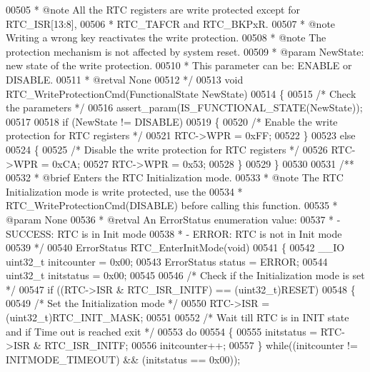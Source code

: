 \begin{DoxyCode}
00505 \textcolor{comment}{  * @note   All the RTC registers are write protected except for RTC\_ISR[13:8], }
00506 \textcolor{comment}{  *         RTC\_TAFCR and RTC\_BKPxR.}
00507 \textcolor{comment}{  * @note   Writing a wrong key reactivates the write protection.}
00508 \textcolor{comment}{  * @note   The protection mechanism is not affected by system reset.  }
00509 \textcolor{comment}{  * @param  NewState: new state of the write protection.}
00510 \textcolor{comment}{  *          This parameter can be: ENABLE or DISABLE.}
00511 \textcolor{comment}{  * @retval None}
00512 \textcolor{comment}{  */}
00513 \textcolor{keywordtype}{void} RTC_WriteProtectionCmd(FunctionalState NewState)
00514 \{
00515   \textcolor{comment}{/* Check the parameters */}
00516   assert_param(IS\_FUNCTIONAL\_STATE(NewState));
00517 
00518   \textcolor{keywordflow}{if} (NewState != DISABLE)
00519   \{
00520     \textcolor{comment}{/* Enable the write protection for RTC registers */}
00521     RTC->WPR = 0xFF;
00522   \}
00523   \textcolor{keywordflow}{else}
00524   \{
00525     \textcolor{comment}{/* Disable the write protection for RTC registers */}
00526     RTC->WPR = 0xCA;
00527     RTC->WPR = 0x53;
00528   \}
00529 \}
00530 
00531 \textcolor{comment}{/**}
00532 \textcolor{comment}{  * @brief  Enters the RTC Initialization mode.}
00533 \textcolor{comment}{  * @note   The RTC Initialization mode is write protected, use the }
00534 \textcolor{comment}{  *         RTC\_WriteProtectionCmd(DISABLE) before calling this function.    }
00535 \textcolor{comment}{  * @param  None}
00536 \textcolor{comment}{  * @retval An ErrorStatus enumeration value:}
00537 \textcolor{comment}{  *          - SUCCESS: RTC is in Init mode}
00538 \textcolor{comment}{  *          - ERROR: RTC is not in Init mode  }
00539 \textcolor{comment}{  */}
00540 ErrorStatus RTC_EnterInitMode(\textcolor{keywordtype}{void})
00541 \{
00542   \_\_IO uint32\_t initcounter = 0x00;
00543   ErrorStatus status = ERROR;
00544   uint32\_t initstatus = 0x00;
00545 
00546   \textcolor{comment}{/* Check if the Initialization mode is set */}
00547   \textcolor{keywordflow}{if} ((RTC->ISR & RTC_ISR_INITF) == (uint32\_t)RESET)
00548   \{
00549     \textcolor{comment}{/* Set the Initialization mode */}
00550     RTC->ISR = (uint32\_t)RTC_INIT_MASK;
00551 
00552     \textcolor{comment}{/* Wait till RTC is in INIT state and if Time out is reached exit */}
00553     \textcolor{keywordflow}{do}
00554     \{
00555       initstatus = RTC->ISR & RTC_ISR_INITF;
00556       initcounter++;
00557     \} \textcolor{keywordflow}{while}((initcounter != INITMODE_TIMEOUT) && (initstatus == 0x00));

\end{DoxyCode}
